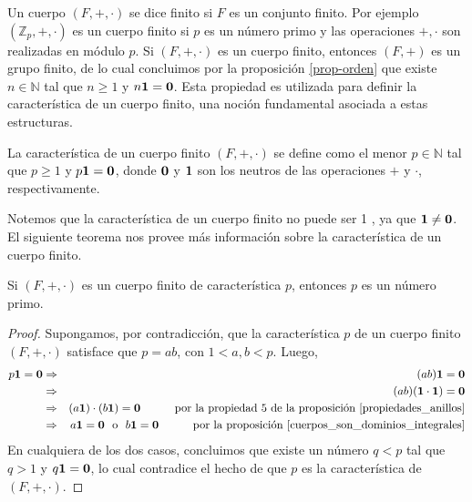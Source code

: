 Un cuerpo $(F,+,\cdot)$ se dice finito si $F$ es un conjunto
finito. Por ejemplo $(\mathbb{Z}_p, +, \cdot)$ es un cuerpo finito si
$p$ es un número primo y las operaciones $+, \cdot$ son realizadas en
módulo $p$.
Si $(F,+,\cdot)$ es un cuerpo finito, entonces $(F,+)$ es un grupo
finito, de lo cual concluimos por la proposición \ref{prop-orden} que
existe $n \in \mathbb{N}$ tal que $n \geq 1$ y $n \mathbf{1} = \mathbf{0}$. Esta propiedad es
utilizada para definir la característica de un cuerpo finito, una
noción fundamental asociada a estas estructuras.
\begin{definition}
La característica de un cuerpo finito $(F, +, \cdot)$ se define como el menor $p\in \mathbb{N}$ tal que $p \geq 1$ y $p \mathbf{1} = \mathbf{0}$, donde $\mathbf{0}$ y $\mathbf{1}$ son los neutros de las operaciones $+$ y $\cdot$, respectivamente.
\end{definition}
Notemos que la característica de un cuerpo finito no puede ser 1 , ya
que $\mathbf{1} \neq \mathbf{0} $. El siguiente teorema nos provee más información
sobre la característica de un cuerpo finito.
\begin{theorem}\label{caracteristica primo}
Si $(F,+,\cdot)$ es un cuerpo finito de característica $p$, entonces
$p$ es un número primo.
\end{theorem}
\begin{proof}
Supongamos, por contradicción, que la característica $p$ de un cuerpo
finito $(F, +, \cdot)$ satisface que $p = ab$, con $1<a, b<p$. Luego,
\begin{eqnarray*}
	p\mathbf{1}  = \mathbf{0} &\Rightarrow & (a b)\mathbf{1} = \mathbf{0} \\
        &\Rightarrow & (a b) (\mathbf{1} \cdot \mathbf{1}) = \mathbf{0} \\
	&\Rightarrow & (a\mathbf{1}) \cdot (b\mathbf{1}) =  \mathbf{0} \quad\quad\quad \text{por la propiedad 5 de la proposición \ref{propiedades_anillos}}\\
	&\Rightarrow& a \mathbf{1}  = \mathbf{0} \ \text{ o } \ b\mathbf{1}  = \mathbf{0} \quad\quad\quad \text{por la proposición \ref{cuerpos_son_dominios_integrales}}
\end{eqnarray*}
En cualquiera de los dos casos, concluimos que existe un número $q <
p$ tal que $q > 1$ y $q \mathbf{1} = \mathbf{0}$, lo cual contradice el hecho de que
$p$ es la característica de $(F, +, \cdot)$.
\end{proof}
